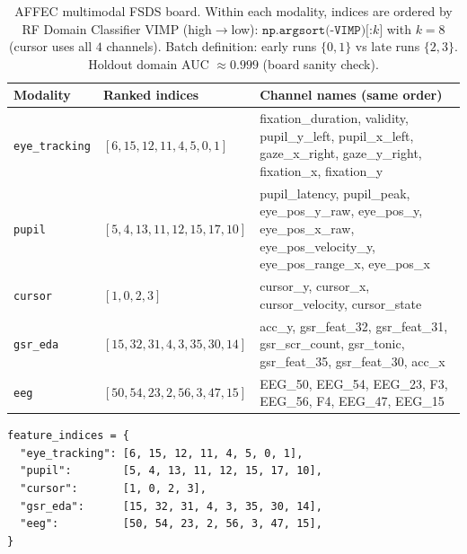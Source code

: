 \begin{table}[ht]
\centering
\caption{AFFEC multimodal FSDS board. Within each modality, indices are ordered by
RF Domain Classifier VIMP (high$\to$low): $\texttt{np.argsort(-VIMP)[:$k$]}$ with $k{=}8$
(cursor uses all $4$ channels). Batch definition: early runs $\{0,1\}$ vs late runs $\{2,3\}$.
Holdout domain AUC $\approx 0.999$ (board sanity check).}
\label{tab:affec-fsds-rf-rank}
\small
\begin{tabular}{@{}l l p{7.6cm}@{}}
\toprule
Modality & Ranked indices & Channel names (same order) \\
\midrule
\texttt{eye\_tracking}
  & $[6,15,12,11,4,5,0,1]$
  & fixation\_duration, validity, pupil\_y\_left, pupil\_x\_left,
    gaze\_x\_right, gaze\_y\_right, fixation\_x, fixation\_y \\
\texttt{pupil}
  & $[5,4,13,11,12,15,17,10]$
  & pupil\_latency, pupil\_peak, eye\_pos\_y\_raw, eye\_pos\_y,
    eye\_pos\_x\_raw, eye\_pos\_velocity\_y, eye\_pos\_range\_x, eye\_pos\_x \\
\texttt{cursor}
  & $[1,0,2,3]$
  & cursor\_y, cursor\_x, cursor\_velocity, cursor\_state \\
\texttt{gsr\_eda}
  & $[15,32,31,4,3,35,30,14]$
  & acc\_y, gsr\_feat\_32, gsr\_feat\_31, gsr\_scr\_count,
    gsr\_tonic, gsr\_feat\_35, gsr\_feat\_30, acc\_x \\
\texttt{eeg}
  & $[50,54,23,2,56,3,47,15]$
  & EEG\_50, EEG\_54, EEG\_23, F3, EEG\_56, F4, EEG\_47, EEG\_15 \\
\bottomrule
\end{tabular}
\end{table}

\begin{verbatim}
feature_indices = {
  "eye_tracking": [6, 15, 12, 11, 4, 5, 0, 1],
  "pupil":        [5, 4, 13, 11, 12, 15, 17, 10],
  "cursor":       [1, 0, 2, 3],
  "gsr_eda":      [15, 32, 31, 4, 3, 35, 30, 14],
  "eeg":          [50, 54, 23, 2, 56, 3, 47, 15],
}
\end{verbatim}
